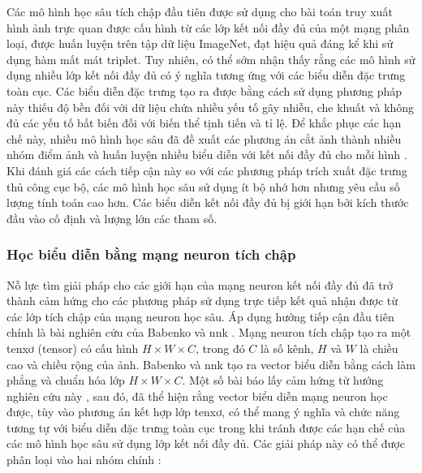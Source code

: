 Các mô hình học sâu tích chập đầu tiên được sử dụng cho bài toán truy xuất hình ảnh trực quan được cấu hình từ các lớp kết nối đầy đủ\cite{razavian2014cnn, gong2014multiscale, babenko2014neural, deepindex, image-classification-retrieval, wang2014deep} của một mạng phân loại, được huấn luyện trên tập dữ liệu ImageNet\cite{russakovsky2015imagenet}, đạt hiệu quả đáng kể khi sử dụng hàm mất mát triplet\cite{wang2014deep, gomezojeda2015training}. Tuy nhiên, có thể sớm nhận thấy rằng các mô hình sử dụng nhiều lớp kết nối đầy đủ có ý nghĩa tương ứng với các biểu diễn đặc trưng toàn cục. Các biểu diễn đặc trưng tạo ra được bằng cách sử dụng phương pháp này thiếu độ bền đối với dữ liệu chứa nhiều yếu tố gây nhiễu, che khuất và không đủ các yếu tố bất biến đối với biến thể tịnh tiến và tỉ lệ. Để khắc phục các hạn chế này, nhiều mô hình học sâu đã đề xuất các phương án cắt ảnh thành nhiều nhóm điểm ảnh và huấn luyện nhiều biểu diễn với kết nối đầy đủ cho mỗi hình \cite{razavian2014cnn, babenko2014neural}. Khi đánh giá các cách tiếp cận này so với các phương pháp trích xuất đặc trưng thủ công cục bộ, các mô hình học sâu sử dụng ít bộ nhớ hơn nhưng yêu cầu số lượng tính toán cao hơn. Các biểu diễn kết nối đầy đủ bị giới hạn bởi kích thước đầu vào cố định và lượng lớn các tham số.

\subsubsection{Học biểu diễn bằng mạng neuron tích chập}

Nỗ lực tìm giải pháp cho các giới hạn của mạng neuron kết nối đầy đủ đã trở thành cảm hứng cho các phương pháp sử dụng trực tiếp kết quả nhận được từ các lớp tích chập của mạng neuron học sâu. Áp dụng hướng tiếp cận đầu tiên chính là bài nghiên cứu của Babenko và nnk \cite{babenko2014neural}. Mạng neuron tích chập tạo ra một tenxơ (tensor) có cấu hình \(H \times W \times C\), trong đó \(C\) là số kênh, \(H\) và \(W\) là chiều cao và chiều rộng của ảnh. Babenko và nnk tạo ra vector biểu diễn bằng cách làm phẳng và chuẩn hóa lớp \(H \times W \times C\). Một số bài báo lấy cảm hứng từ hướng nghiên cứu này \cite{hou2015convolutional}, sau đó, đã thể hiện rằng vector biểu diễn mạng neuron học được, tùy vào phương án kết hợp lớp tenxơ, có thể mang ý nghĩa và chức năng tương tự với biểu diễn đặc trưng toàn cục trong khi tránh được các hạn chế của các mô hình học sâu sử dụng lớp kết nối đầy đủ. Các giải pháp này có thể được phân loại vào hai nhóm chính \cite{Masone2021ASO}:

